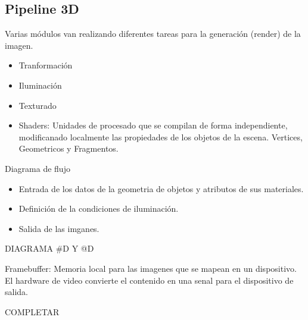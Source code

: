 \subsection{Pipeline 3D}\label{subsec:pipeline-3d}
Varias módulos van realizando diferentes tareas para la generación (render) de la imagen.
\begin{itemize}
  \item Tranformación
  \item Iluminación
  \item Texturado
  \item Shaders: Unidades de procesado que se compilan de forma independiente, modificanado localmente las propiedades de los objetos de la escena. Vertices, Geometricos y Fragmentos.
\end{itemize}
Diagrama de flujo
\begin{itemize}
  \item Entrada de los datos de la geometria de objetos y atributos de sus materiales.
  \item Definición de la condiciones de iluminación.
  \item Salida de las imganes.
\end{itemize}
DIAGRAMA #D Y @D

Framebuffer: Memoria local para las imagenes que se mapean en un dispositivo. El hardware de video convierte el contenido en una senal para el dispositivo de salida.

  COMPLETAR